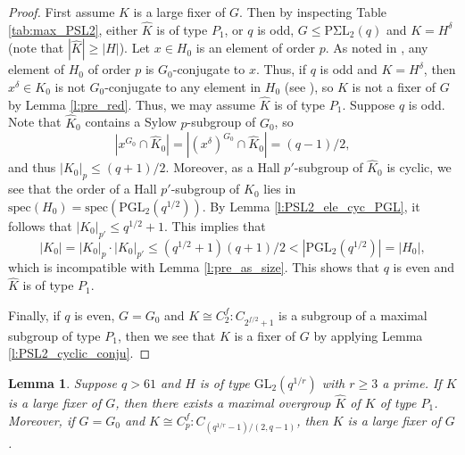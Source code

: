 \documentclass[twoside,a4paper,reqno,11pt]{amsart}
\newcommand{\<}{\langle}
\renewcommand{\>}{\rangle}
\newcommand{\leqs}{\leqslant}
\newcommand{\geqs}{\geqslant}
\newcommand{\GL}{\mathrm{GL}}
\newcommand{\PGL}{\mathrm{PGL}}
\newcommand{\PSigmaL}{\mathrm{P\Sigma L}}
\newcommand{\Spec}{\mathrm{spec}}
\newtheorem{lem}[thm]{Lemma}
\theoremstyle{definition}
\begin{document}
	\begin{proof}
		First assume $K$ is a large fixer of $G$. Then by inspecting Table \ref{tab:max_PSL2}, either $\widehat{K}$ is of type $P_1$, or $q$ is odd, $G\leqs\PSigmaL_2(q)$ and $K = H^\delta$ (note that $|\widehat{K}|\geqs |H|$). Let $x\in H_0$ is an element of order $p$. As noted in \cite[Remark 5.5.2(ii)]{BG_classical}, any element of $H_0$ of order $p$ is $G_0$-conjugate to $x$. Thus, if $q$ is odd and $K = H^\delta$, then $x^\delta\in K_0$ is not $G_0$-conjugate to any element in $H_0$ (see \cite[Lemma 3.2.8]{BG_classical}), so $K$ is not a fixer of $G$ by Lemma \ref{l:pre_red}. Thus, we may assume $\widehat{K}$ is of type $P_1$. Suppose $q$ is odd. Note that $\widehat{K}_0$ contains a Sylow $p$-subgroup of $G_0$, so
		\begin{equation*}
		|x^{G_0}\cap \widehat{K}_0| = |(x^\delta)^{G_0}\cap \widehat{K}_0| = (q-1)/2,
		\end{equation*}
		and thus $|K_0|_p\leqs (q+1)/2$. Moreover, as a Hall $p'$-subgroup of $\widehat{K}_0$ is cyclic, we see that the order of a Hall $p'$-subgroup of $K_0$ lies in $\Spec(H_0) = \Spec(\PGL_2(q^{1/2}))$. By Lemma \ref{l:PSL2_ele_cyc_PGL}, it follows that $|K_0|_{p'}\leqs q^{1/2}+1$. This implies that
		\begin{equation*}
		|K_0| = |K_0|_p\cdot |K_0|_{p'} \leqs (q^{1/2}+1)(q+1)/2 < |\PGL_2(q^{1/2})| = |H_0|,
		\end{equation*}
		which is incompatible with Lemma \ref{l:pre_as_size}. This shows that $q$ is even and $\widehat{K}$ is of type $P_1$.
		
		Finally, if $q$ is even, $G = G_0$ and $K \cong C_2^f{:}C_{2^{f/2}+1}$ is a subgroup of a maximal subgroup of type $P_1$, then we see that $K$ is a fixer of $G$ by applying Lemma \ref{l:PSL2_cyclic_conju}.
	\end{proof}
	
	\begin{lem}
		\label{l:PSL2_C5_odd}
		Suppose $q > 61$ and $H$ is of type $\GL_2(q^{1/r})$ with $r\geqs 3$ a prime. If $K$ is a large fixer of $G$, then there exists a maximal overgroup $\widehat{K}$ of $K$ of type $P_1$. Moreover, if $G = G_0$ and $K \cong C_p^f{:}C_{(q^{1/r}-1)/(2,q-1)}$, then $K$ is a large fixer of $G$.
	\end{lem}
	
\end{document}
